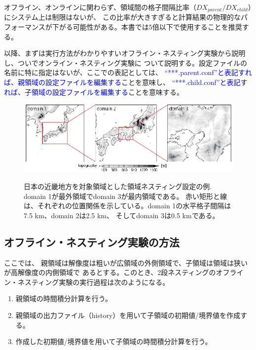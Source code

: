 オフライン、オンラインに関わらず、領域間の格子間隔比率（$DX_{parent}/DX_{child}$）にシステム上は制限はないが、
この比率が大きすぎると計算結果の物理的なパフォーマンスが下がる可能性がある。本書では5倍以下で使用することを推奨する。

以降、まずは実行方法がわかりやすいオフライン・ネスティング実験から説明し、ついでオンライン・ネスティング実験に
ついて説明する。設定ファイルの名前に特に指定はないが、ここでの表記としては、
\textcolor{blue}{``***.parent.conf''と表記すれば、親領域の設定ファイルを編集する}ことを意味し、
\textcolor{blue}{``***.child.conf''と表記すれば、子領域の設定ファイルを編集する}ことを意味する。


\begin{figure}[t]
\begin{center}
  \includegraphics[width=1.0\hsize]{./figure/nesting_sample.eps}\\
  \caption{日本の近畿地方を対象領域とした領域ネスティング設定の例. domain 1が最外領域でdomain 3が最内領域である。
           赤い矩形と線は、それぞれの位置関係を示している。domain 1の水平格子間隔は7.5 km、domain 2は2.5 km、
           そしてdomain 3は0.5 kmである。}
  \label{fig_nestsample}
\end{center}
\end{figure}


\subsection{オフライン・ネスティング実験の方法} \label{sec:nest_offline}

ここでは、
親領域は解像度は粗いが広領域の外側領域で、子領域は領域は狭いが高解像度の内側領域で
あるとする。このとき、2段ネスティングのオフライン・ネスティング実験の実行過程は次のようになる。

{\gt
\begin{enumerate}
 \item 親領域の時間積分計算を行う。
 \item 親領域の出力ファイル（history）を用いて子領域の初期値/境界値を作成する。
 \item 作成した初期値/境界値を用いて子領域の時間積分計算を行う。
\end{enumerate}
}

